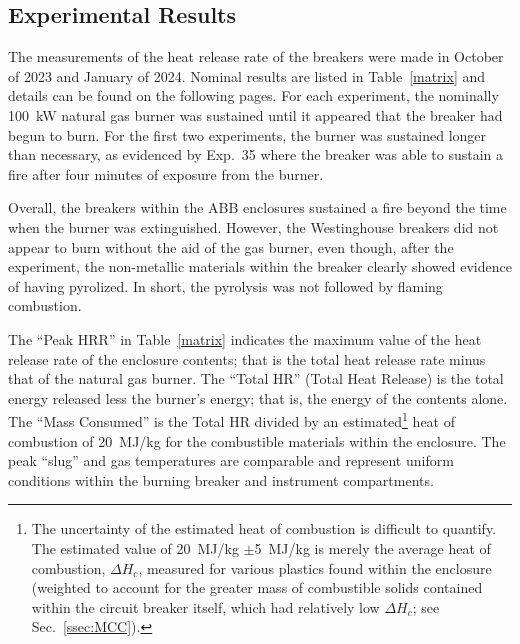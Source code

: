 \subsection{Experimental Results}
\label{sec:results}

The measurements of the heat release rate of the breakers were made in October of 2023 and January of 2024. Nominal results are listed in Table~\ref{matrix} and details can be found on the following pages. For each experiment, the nominally 100~kW natural gas burner was sustained until it appeared that the breaker had begun to burn. For the first two experiments, the burner was sustained longer than necessary, as evidenced by Exp.~35 where the breaker was able to sustain a fire after four minutes of exposure from the burner.

Overall, the breakers within the ABB enclosures sustained a fire beyond the time when the burner was extinguished. However, the Westinghouse breakers did not appear to burn without the aid of the gas burner, even though, after the experiment, the non-metallic materials within the breaker clearly showed evidence of having pyrolized. In short, the pyrolysis was not followed by flaming combustion.

The ``Peak HRR'' in Table~\ref{matrix} indicates the maximum value of the heat release rate of the enclosure contents; that is the total heat release rate minus that of the natural gas burner. The ``Total HR'' (Total Heat Release) is the total energy released less the burner's energy; that is, the energy of the contents alone. The ``Mass Consumed'' is the Total HR divided by an estimated\footnote{The uncertainty of the estimated heat of combustion is difficult to quantify. The estimated value of 20~MJ/kg $\pm$5~MJ/kg is merely the average heat of combustion, $\Delta H_c$, measured for various plastics found within the enclosure (weighted to account for the greater mass of combustible solids contained within the circuit breaker itself, which had relatively low $\Delta H_c$; see Sec.~\ref{ssec:MCC}).} heat of combustion of 20~MJ/kg for the combustible materials within the enclosure. The peak ``slug'' and gas temperatures are comparable and represent uniform conditions within the burning breaker and instrument compartments.


